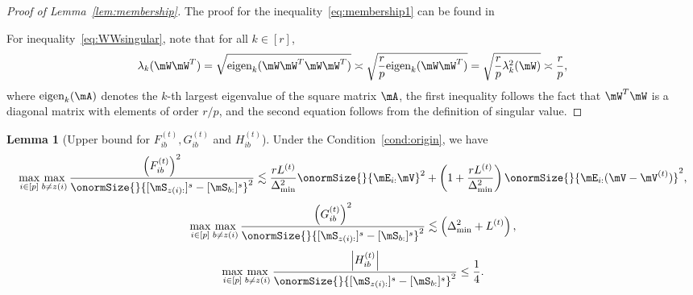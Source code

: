 \documentclass[lettersize,onecolumn,journal]{IEEEtran}
\theoremstyle{definition}
\newtheorem{lem}{Lemma}
\theoremstyle{definition}
\newcommand{\of}[1]{\left(#1\right)}
\newcommand{\aabs}[1]{\left|#1\right|}
\begin{document}
\begin{proof}[Proof of Lemma~\ref{lem:membership}] The proof for the inequality~\eqref{eq:membership1} can be found in \citet[Proof of Lemma 4]{han2020exact}

For inequality~\eqref{eq:WWsingular}, note that for all $k \in [r]$,
\begin{align}
    \lambda_k(\mW\mW^T) = \sqrt{\text{eigen}_k (\mW \mW^T\mW\mW^T)} \asymp \sqrt{\frac{r}{p} \text{eigen}_k (\mW \mW^T)} = \sqrt{\frac{r}{p} \lambda^2_k(\mW)} \asymp \frac{r}{p},
\end{align}
where $\text{eigen}_k(\mA)$ denotes the $k$-th largest eigenvalue of the square matrix $\mA$, the first inequality follows the fact that $\mW^T\mW$ is a diagonal matrix with elements of order $r/p$, and the second equation follows from the definition of singular value.
\end{proof}

\begin{lem}[Upper bound for $F_{ib}^{(t)}, G_{ib}^{(t)}$ and $H_{ib}^{(t)}$]\label{lem:upper_fgh} Under the Condition~\ref{cond:origin}, we have 
    \begin{equation}\label{eq:fib}
        \max_{i \in [p]} \max_{b \neq z(i)} \frac{\of{F_{ib}^{(t)}}^2}{ \onormSize{}{ [  \mS_{z(i):} ]^s  -  [ \mS_{b:} ]^s }^2 } \lesssim  \frac{r L^{(t)}}{ \Delta_{\min}^2} \onormSize{}{\mE_{i:} \mV}^2 + \of{1 +  \frac{ r L^{(t)}}{ \Delta_{\min}^2}} \onormSize{}{\mE_{i:} (\mV - \mV^{(t)})}^2 ,
    \end{equation}
    \begin{equation}\label{eq:gib}
        \max_{i \in [p]} \max_{b \neq z(i)} \frac{ \of{  G_{ib}^{(t)} }^2  }{ \onormSize{}{ [\mS_{z(i):} ]^s - [\mS_{b:}]^s }^2}  \lesssim \of{ \Delta_{\min}^2 +L^{(t)}},
    \end{equation}
    \begin{equation}\label{eq:hib}
        \max_{i \in [p]} \max_{b \neq z(i)}  \frac{ \aabs{  H_{ib}^{(t)} }  }{ \onormSize{}{ [\mS_{z(i):} ]^s - [\mS_{b:}]^s }^2} \leq \frac{1}{4}.
    \end{equation}
    \end{lem}
    
\end{document}
